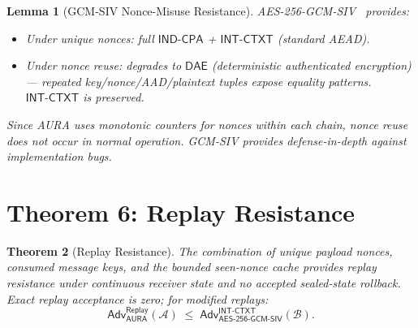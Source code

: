 \documentclass[11pt,a4paper]{article}
\newtheorem{theorem}{Theorem}[section]
\newtheorem{lemma}[theorem]{Lemma}
\theoremstyle{definition}
\theoremstyle{remark}
\newcommand{\adv}{\mathsf{Adv}}
\newcommand{\advA}{\mathcal{A}}
\newcommand{\advB}{\mathcal{B}}
\newcommand{\AEAD}{\mathsf{AES\text{-}256\text{-}GCM\text{-}SIV}}
\newcommand{\INDCPA}{\mathsf{IND\text{-}CPA}}
\newcommand{\INTCTXT}{\mathsf{INT\text{-}CTXT}}
\begin{document}
\begin{lemma}[GCM-SIV Nonce-Misuse Resistance]
\label{lem:gcm-siv}
AES-256-GCM-SIV~\cite{rfc8452} provides:
\begin{itemize}[nosep]
  \item Under unique nonces: full $\INDCPA$ + $\INTCTXT$ (standard AEAD).
  \item Under nonce reuse: degrades to $\mathsf{DAE}$ (deterministic
        authenticated encryption) --- repeated key/nonce/AAD/plaintext tuples
        expose equality patterns. $\INTCTXT$ is preserved.
\end{itemize}
Since AURA uses monotonic counters for nonces within each chain, nonce reuse
does not occur in normal operation.  GCM-SIV provides defense-in-depth
against implementation bugs.
\end{lemma}


\section{Theorem 6: Replay Resistance}
\label{sec:thm6}

\begin{theorem}[Replay Resistance]
\label{thm:replay}
The combination of unique payload nonces, consumed message keys, and the
bounded seen-nonce cache provides replay resistance under continuous receiver
state and no accepted sealed-state rollback. Exact replay acceptance is zero;
for modified replays:
\[
  \adv^{\mathsf{Replay}}_{\mathsf{AURA}}(\advA) \;\leq\;
  \adv^{\INTCTXT}_{\AEAD}(\advB).
\]
\end{theorem}
\end{document}
